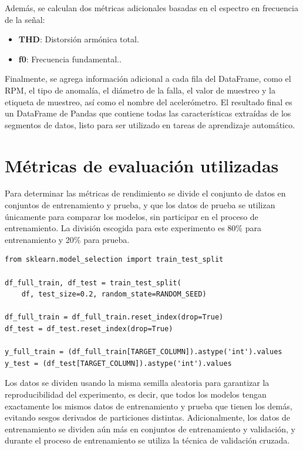 \documentclass[11pt,a4paper,spanish]{book}
\numberwithin{equation}{chapter}
\numberwithin{figure}{chapter}
\begin{document}
Además, se calculan dos métricas adicionales basadas en el espectro en frecuencia de la señal:

\begin{itemize}
\item \textbf{THD}: Distorsión armónica total.
\item \textbf{f0}: Frecuencia fundamental..
\end{itemize}


Finalmente, se agrega información adicional a cada fila del DataFrame, como el RPM, el 
tipo de anomalía, el diámetro de la falla, el valor de muestreo y la etiqueta de 
muestreo, así como el nombre del acelerómetro. El resultado final es un DataFrame de 
Pandas que contiene todas las características extraídas de los segmentos de datos, 
listo para ser utilizado en tareas de aprendizaje automático.



\section{Métricas de evaluación utilizadas}


Para determinar las métricas de rendimiento se divide el conjunto de datos en conjuntos 
de entrenamiento y prueba, y que los datos de prueba se utilizan únicamente para 
comparar los modelos, sin participar en el proceso de entrenamiento. La división 
escogida para este experimento es 80\% para entrenamiento y 20\% para prueba. 


\begin{lstlisting}
from sklearn.model_selection import train_test_split

df_full_train, df_test = train_test_split(
    df, test_size=0.2, random_state=RANDOM_SEED)

df_full_train = df_full_train.reset_index(drop=True)
df_test = df_test.reset_index(drop=True)

y_full_train = (df_full_train[TARGET_COLUMN]).astype('int').values
y_test = (df_test[TARGET_COLUMN]).astype('int').values
\end{lstlisting}


Los datos se dividen usando la misma semilla aleatoria para garantizar la 
reproducibilidad del experimento, es decir, que todos los modelos tengan exactamente 
los mismos datos de entrenamiento y prueba que tienen los demás, evitando sesgos 
derivados de particiones distintas. Adicionalmente, los datos de entrenamiento se 
dividen aún más en conjuntos de entrenamiento y validación, y durante el proceso de 
entrenamiento se utiliza la técnica de validación cruzada. 
\end{document}
